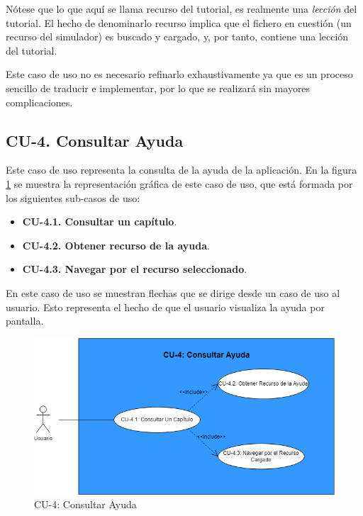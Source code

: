 Nótese que lo que aquí se llama recurso del tutorial, es realmente una \textit{lección} del tutorial. El hecho de de\-no\-mi\-nar\-lo recurso implica que el fichero en cuestión (un recurso del simulador) es buscado y cargado, y, por tanto, contiene una lección del tutorial.

Este caso de uso no es necesario refinarlo exhaustivamente ya que es un proceso sencillo de traducir e implementar, por lo que se realizará sin mayores complicaciones.

 \subsection{CU-4. Consultar Ayuda}

 Este caso de uso representa la consulta de la ayuda de la aplicación. En la figura \ref{fig:CU4} se muestra la representación gráfica de este caso de uso, que está formada por los siguientes sub-casos de uso:

 \begin{itemize}
  \item \textbf{CU-4.1. Consultar un capítulo}.
  \item \textbf{CU-4.2. Obtener recurso de la ayuda}.
  \item \textbf{CU-4.3. Navegar por el recurso seleccionado}.
 \end{itemize}

 En este caso de uso se muestran flechas que se dirige desde un caso de uso al usuario. Esto representa el hecho de que el usuario visualiza la ayuda por pantalla.

 \begin{figure}[H]
       \begin{center} 
 	\includegraphics[scale=0.55]{figuras/Cap7/CU4.png}
 	\caption{CU-4: Consultar Ayuda}
 	\label{fig:CU4}
       \end{center}
   \end{figure}

